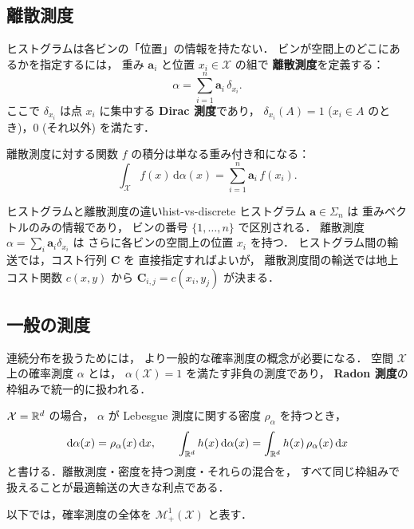 \subsection{離散測度}\label{subsec:discrete-measure}

ヒストグラムは各ビンの「位置」の情報を持たない．
ビンが空間上のどこにあるかを指定するには，
重み $\mathbf{a}_i$ と位置 $x_i \in \mathcal{X}$ の組で
\textbf{離散測度}を定義する：
\begin{equation}\label{eq:discrete-measure}
  \alpha = \sum_{i=1}^{n} \mathbf{a}_i \, \delta_{x_i}.
\end{equation}
ここで $\delta_{x_i}$ は点 $x_i$ に集中する \textbf{Dirac 測度}であり，
$\delta_{x_i}(A) = 1$ ($x_i \in A$ のとき)，$0$ (それ以外) を満たす．

離散測度に対する関数 $f$ の積分は単なる重み付き和になる：
\[
  \int_{\mathcal{X}} f(x)\, \mathrm{d}\alpha(x)
  = \sum_{i=1}^{n} \mathbf{a}_i \, f(x_i).
\]

\begin{remark}{ヒストグラムと離散測度の違い}{hist-vs-discrete}
ヒストグラム $\mathbf{a} \in \Sigma_n$ は
重みベクトルのみの情報であり，
ビンの番号 $\{1, \ldots, n\}$ で区別される．
離散測度 $\alpha = \sum_i \mathbf{a}_i \delta_{x_i}$ は
さらに各ビンの空間上の位置 $x_i$ を持つ．
ヒストグラム間の輸送では，コスト行列 $\mathbf{C}$ を
直接指定すればよいが，
離散測度間の輸送では地上コスト関数 $c(x,y)$ から
$\mathbf{C}_{i,j} = c(x_i, y_j)$ が決まる．
\end{remark}

\subsection{一般の測度}\label{subsec:general-measure}

連続分布を扱うためには，
より一般的な確率測度の概念が必要になる．
空間 $\mathcal{X}$ 上の確率測度 $\alpha$ とは，
$\alpha(\mathcal{X}) = 1$ を満たす非負の測度であり，
\textbf{Radon 測度}の枠組みで統一的に扱われる．

$\mathcal{X} = \mathbb{R}^d$ の場合，
$\alpha$ が Lebesgue 測度に関する密度
$\rho_\alpha$ を持つとき，
\[
  \mathrm{d}\alpha(x) = \rho_\alpha(x)\, \mathrm{d}x,
  \qquad
  \int_{\mathbb{R}^d} h(x)\, \mathrm{d}\alpha(x)
  = \int_{\mathbb{R}^d} h(x)\, \rho_\alpha(x)\, \mathrm{d}x
\]
と書ける．離散測度・密度を持つ測度・それらの混合を，
すべて同じ枠組みで扱えることが最適輸送の大きな利点である．

以下では，確率測度の全体を
$\mathcal{M}^1_+(\mathcal{X})$ と表す．


